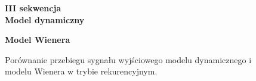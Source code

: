 \documentclass[a4paper,titlepage,11pt,floatssmall]{mwrep}
\begin{document}
\newpage

\begin{figure}[h!]

\begin{center}
\Large \textbf{III sekwencja} \\
\vspace{0.5cm}
\Large \textbf{Model dynamiczny}
\end{center}

\centering
{}
\hfill
{}

\begin{center}
\Large \textbf{Model Wienera}
\end{center}

\hfill
{}
\caption{Porównanie przebiegu sygnału wyjściowego modelu dynamicznego i modelu Wienera w trybie rekurencyjnym.}
\end{figure}
\end{document}
